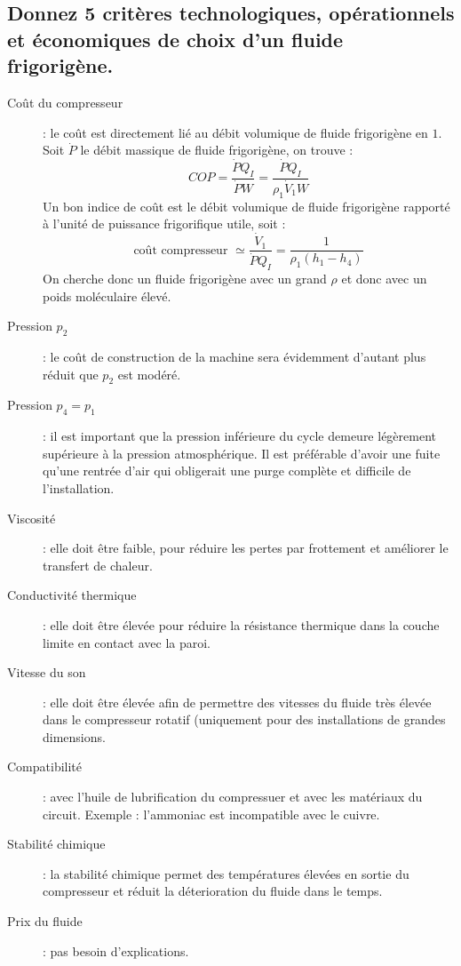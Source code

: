 \subsection{Donnez 5 critères technologiques, opérationnels et économiques de choix d'un fluide frigorigène.}
\begin{description}
\item[Coût du compresseur] : le coût est directement lié au débit volumique de fluide frigorigène en $1$. Soit $\dot{P}$ le débit massique de fluide frigorigène, on trouve :
\begin{equation} COP = \frac{\dot{P}Q_I}{\dot{P}W} = \frac{\dot{P}Q_I}{\rho_1\dot{V}_1W} \end{equation} 
Un bon indice de coût est le débit volumique de fluide frigorigène rapporté à l'unité de puissance frigorifique utile, soit :
\begin{equation} \text{coût compresseur } \simeq \frac{\dot{V}_1}{\dot{P}Q_I} = \frac{1}{\rho_1(h_1-h_4)} \end{equation}
On cherche donc un fluide frigorigène avec un grand $\rho$ et donc avec un poids moléculaire élevé.
\item[Pression $p_2$] : le coût de construction de la machine sera évidemment d'autant plus réduit que $p_2$ est modéré.
\item[Pression $p_4=p_1$] : il est important que la pression inférieure du cycle demeure légèrement supérieure à la pression atmosphérique. Il est préférable d'avoir une fuite qu'une rentrée d'air qui obligerait une purge complète et difficile de l'installation.
\item[Viscosité] : elle doit être faible, pour réduire les pertes par frottement et améliorer le transfert de chaleur.
\item[Conductivité thermique] : elle doit être élevée pour réduire la résistance thermique dans la couche limite en contact avec la paroi.
\item[Vitesse du son] : elle doit être élevée afin de permettre des vitesses du fluide très élevée dans le compresseur rotatif (uniquement pour des installations de grandes dimensions.
\item[Compatibilité] : avec l'huile de lubrification du compressuer et avec les matériaux du circuit. Exemple : l'ammoniac est incompatible avec le cuivre.
\item[Stabilité chimique] : la stabilité chimique permet des températures élevées en sortie du compresseur et réduit la déterioration du fluide dans le temps.
\item[Prix du fluide] : pas besoin d'explications.
\end{description}

